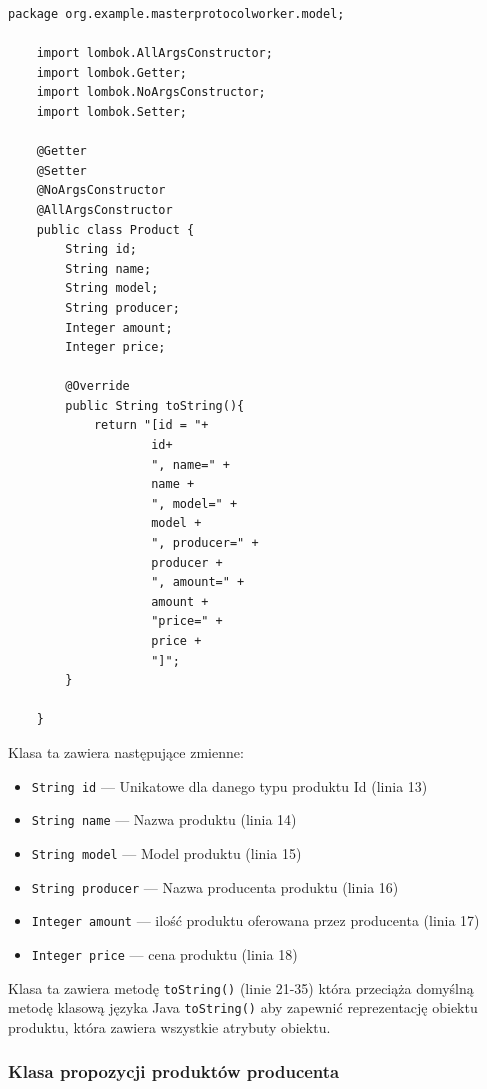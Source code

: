 \begin{lstlisting}[caption=Klasa reprezentująca produkt, label=produktWorkermodelCode]
    package org.example.masterprotocolworker.model;
    
    import lombok.AllArgsConstructor;
    import lombok.Getter;
    import lombok.NoArgsConstructor;
    import lombok.Setter;
    
    @Getter
    @Setter
    @NoArgsConstructor
    @AllArgsConstructor
    public class Product {
        String id;
        String name;
        String model;
        String producer;
        Integer amount;
        Integer price;
    
        @Override
        public String toString(){
            return "[id = "+
                    id+
                    ", name=" +
                    name +
                    ", model=" +
                    model +
                    ", producer=" +
                    producer +
                    ", amount=" +
                    amount +
                    "price=" +
                    price +
                    "]";
        }
    
    }
\end{lstlisting}

Klasa ta zawiera następujące zmienne:
\begin{itemize}
    \item \verb|String id| --- Unikatowe dla danego typu produktu Id (linia 13)
    \item \verb|String name| --- Nazwa produktu (linia 14)
    \item \verb|String model| --- Model produktu (linia 15)
    \item \verb|String producer| --- Nazwa producenta produktu (linia 16)
    \item \verb|Integer amount| --- ilość produktu oferowana przez producenta (linia 17)
    \item \verb|Integer price| --- cena produktu (linia 18)
\end{itemize}

Klasa ta zawiera metodę \verb|toString()| (linie 21-35) która przeciąża domyślną metodę klasową języka Java \verb|toString()| aby zapewnić reprezentację obiektu produktu, która zawiera wszystkie atrybuty obiektu.


\subsubsection{Klasa propozycji produktów producenta}

